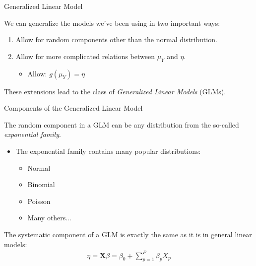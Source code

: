 \documentclass{beamer}\usepackage[]{graphicx}\usepackage[]{color}
\begin{document}
\begin{frame}{Generalized Linear Model}
  
  We can generalize the models we've been using in two important ways:
  \vb
  \begin{enumerate}
  \item Allow for random components other than the normal distribution.
    \vb
  \item Allow for more complicated relations between $\mu_Y$ and $\eta$.
    \vb
    \begin{itemize}
    \item Allow: $g(\mu_Y) = \eta$
    \end{itemize}
  \end{enumerate}
  \vb
  These extensions lead to the class of \emph{Generalized Linear Models} (GLMs).
  
\end{frame}


\begin{frame}{Components of the Generalized Linear Model}
  
  The random component in a GLM can be any distribution from the so-called 
  \emph{exponential family}.
  \vb
  \begin{itemize}
  \item The exponential family contains many popular distributions:
    \vb
    \begin{itemize}
    \item Normal
    \item Binomial
    \item Poisson
    \item Many others...
    \end{itemize}
  \end{itemize}
  \vb
  The systematic component of a GLM is exactly the same as it is in general 
  linear models:
  \begin{align*}
    \eta = \mathbf{X} \beta = \beta_0 + \sum_{p = 1}^P \beta_p X_p
  \end{align*}
  
\end{frame}

\end{document}
